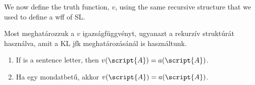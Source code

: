 We now define the truth function, $v$, using the same recursive structure that we used to define a wff of SL.

Most meghatározzuk a $v$ igazságfüggvényt, ugyanazt a rekurzív struktúrát használva, amit a KL jfk meghatározásánál is használtunk.

\begin{enumerate}
\item If  is a sentence letter, then $v(\script{A})=a(\script{A})$.
\item Ha  egy mondatbetű, akkor $v(\script{A})=a(\script{A})$.







\end{enumerate}
